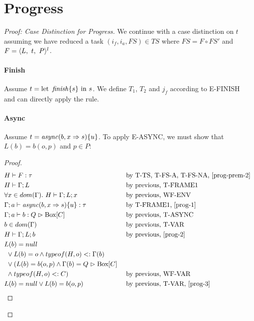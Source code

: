 \section{Progress}
\begin{proof}[Proof: Case Distinction for Progress]
We continue with a case distinction on $t$ assuming we have reduced a task $(i_f, i_a, FS) \in TS$ where $FS = F \circ FS'$ and $F = \sframe{t}$.

\paragraph{Finish}
Assume $t = \text{let } \mathop{\mathit{finish}}\{s\} \text{ in } s$. We define $T_1$, $T_2$ and $j_f$ according to E-FINISH and can directly apply the rule.

\paragraph{Async}
Assume $t = \mathop{\mathit{async}}(b, x \Rightarrow s)\{ u \}$. To apply E-ASYNC, we must show that $L(b) = b(o,p)$ and $p \in P$:

\begin{proof}
\begin{alignat}{2}
        &H \vdash F : \tau && \text{ by T-TS, T-FS-A, T-FS-NA, \cref{prog-prem-2}} \label{prog-1}\\
        &H \vdash \Gamma; L && \text{ by previous, T-FRAME1}\\
        &\forall x \in dom(\Gamma).\ H \vdash \Gamma; L; x && \text{ by previous, WF-ENV}\label{prog-2}\\
        &\Gamma; a \vdash \vn{async}(b, x \Rightarrow s) \{ u \} : \tau && \text{ by T-FRAME1, \cref{prog-1}}\\
        &\Gamma; a \vdash b : Q \vartriangleright \text{Box}[C] && \text{ by previous, T-ASYNC}\label{prog-3}\\
        &b \in dom(\Gamma) && \text{ by previous, T-VAR}\\
        &H \vdash \Gamma; L; b && \text{ by previous, \cref{prog-2}}\\
\nonumber&L(b) = null\\
\nonumber&\ \vee L(b) = o \wedge typeof(H, o) <: \Gamma(b)\\
\nonumber&\ \vee (L(b) = b(o, p) \wedge \Gamma(b) = Q \vartriangleright \text{Box}[C]\\
        &\ \wedge typeof(H, o) <: C) && \text{ by previous, WF-VAR}\\
        &L(b) = null \vee L(b) = b(o,p) && \text{ by previous, T-VAR, \cref{prog-3}}
\end{alignat}


\end{proof}
\end{proof}
